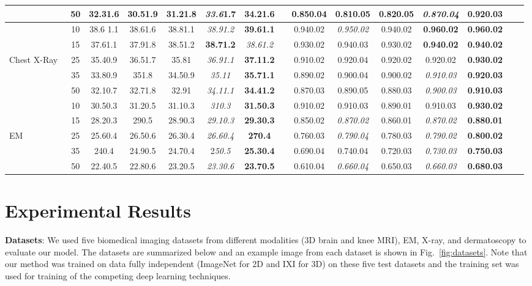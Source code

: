\documentclass[journal,twoside,web]{ieeecolor}
\begin{document}
\begin{table*}
\begin{tabular}{lcccccccccccccc}
& 50 & 32.31.6 & 30.51.9 & 31.21.8 & \textit{33.6}1.7 & \textbf{34.21.6} && 0.850.04 & 0.810.05 & 0.820.05 & \textit{0.870.04} & \textbf{0.920.03}\\
\midrule
& 10 & 38.6 1.1 & 38.61.6 & 38.81.1 & \textit{38.91.2} & \textbf{39.61.1} && 0.940.02 & \textit{0.950.02} & 0.940.02 & \textbf{0.960.02} & \textbf{0.960.02}\\
& 15 & 37.61.1 & 37.91.8 & 38.51.2 & \textbf{38.71.2} & \textit{38.61.2} && 0.930.02 & 0.940.03 & 0.930.02 & \textbf{0.940.02} & \textbf{0.940.02}\\
\verb//Chest X-Ray~\cite{kermany2018identifying}& 25 & 35.40.9 & 36.51.7 & 35.81 & \textit{36.91.1} & \textbf{37.11.2} && 0.910.02 & 0.920.04 & 0.920.02 & 0.920.02 & \textbf{0.930.02}\\
& 35 & 33.80.9 & 351.8 &34.50.9 & \textit{35.11} & \textbf{35.71.1} && 0.890.02 & 0.900.04 & 0.900.02 & \textit{0.910.03} & \textbf{0.920.03}\\
& 50 & 32.10.7 & 32.71.8 & 32.91 & \textit{34.11.1} & \textbf{34.41.2} && 0.870.03 & 0.890.05 & 0.880.03 & \textit{0.900.03} & \textbf{0.910.03}\\
\midrule
& 10 & 30.50.3 & 31.20.5 & 31.10.3 & \textit{310.3} & \textbf{31.50.3} && 0.910.02& 0.910.03 & 0.890.01 &  0.910.03 & \textbf{0.930.02}\\
& 15 & 28.20.3 & 290.5 & 28.90.3 & \textit{29.10.3} & \textbf{29.30.3} && 0.850.02 & \textit{0.870.02} & 0.860.01 & \textit{0.870.02} & \textbf{0.880.01}\\
\verb//EM~\cite{isbi2021}& 25 & 25.60.4 & 26.50.6 & 26.30.4 & \textit{26.60.4} & \textbf{270.4} && 0.760.03 & \textit{0.790.04} & 0.780.03 & \textit{0.790.02} & \textbf{0.800.02}\\
& 35 & 240.4 & 24.90.5 & 24.70.4& 2\textit{50.5} & \textbf{25.30.4} && 0.690.04 & 0.740.04 & 0.720.03 & \textit{0.730.03} & \textbf{0.750.03}\\
& 50 & 22.40.5&22.80.6& 23.20.5& \textit{23.30.6} & \textbf{23.70.5} && 0.610.04 & \textit{0.660.04} & 0.650.03 & \textit{0.660.03} & \textbf{0.680.03}\\
\bottomrule
\end{tabular}
\end{table*}

\section{Experimental Results}\label{sec:experimental}
\textbf{Datasets}: We used five biomedical imaging datasets from different modalities (3D brain and knee MRI), EM, X-ray, and dermatoscopy to evaluate our model. The datasets are summarized below and an example image from each dataset is shown in Fig.~\ref{fig:datasets}.  Note that our method was trained on data fully independent (ImageNet for 2D and IXI for 3D) on these five test datasets and the training set was used for training of the competing deep learning techniques.
\end{document}
